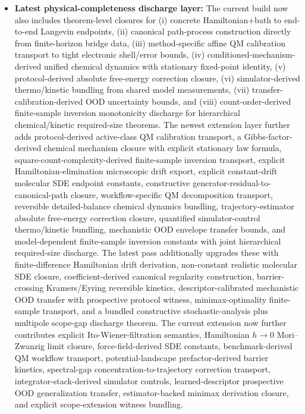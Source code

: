 \begin{itemize}
	\item \textbf{Latest physical-completeness discharge layer:} The current build now also includes theorem-level closures for (i) concrete Hamiltonian+bath to end-to-end Langevin endpoints, (ii) canonical path-process construction directly from finite-horizon bridge data, (iii) method-specific affine QM calibration transport to tight electronic shell/error bounds, (iv) conditioned-mechanism-derived unified chemical dynamics with stationary fixed-point identity, (v) protocol-derived absolute free-energy correction closure, (vi) simulator-derived thermo/kinetic bundling from shared model measurements, (vii) transfer-calibration-derived OOD uncertainty bounds, and (viii) count-order-derived finite-sample inversion monotonicity discharge for hierarchical chemical/kinetic required-size theorems. The newest extension layer further adds protocol-derived active-class QM calibration transport, a Gibbs-factor-derived chemical mechanism closure with explicit stationary law formula, square-count-complexity-derived finite-sample inversion transport, explicit Hamiltonian-elimination microscopic drift export, explicit constant-drift molecular SDE endpoint constants, constructive generator-residual-to-canonical-path closure, workflow-specific QM decomposition transport, reversible detailed-balance chemical dynamics bundling, trajectory-estimator absolute free-energy correction closure, quantified simulator-control thermo/kinetic bundling, mechanistic OOD envelope transfer bounds, and model-dependent finite-sample inversion constants with joint hierarchical required-size discharge. The latest pass additionally upgrades these with finite-difference Hamiltonian drift derivation, non-constant realistic molecular SDE closure, coefficient-derived canonical regularity construction, barrier-crossing Kramers/Eyring reversible kinetics, descriptor-calibrated mechanistic OOD transfer with prospective protocol witness, minimax-optimality finite-sample transport, and a bundled constructive stochastic-analysis plus multipole scope-gap discharge theorem. The current extension now further contributes explicit Ito-Wiener-filtration semantics, Hamiltonian $h\to0$ Mori--Zwanzig limit closure, force-field-derived SDE constants, benchmark-derived QM workflow transport, potential-landscape prefactor-derived barrier kinetics, spectral-gap concentration-to-trajectory correction transport, integrator-stack-derived simulator controls, learned-descriptor prospective OOD generalization transfer, estimator-backed minimax derivation closure, and explicit scope-extension witness bundling.

\end{itemize}
